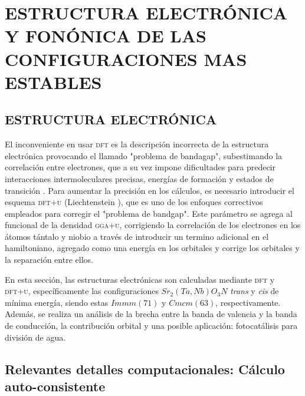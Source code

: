 
\chapter{ESTRUCTURA ELECTRÓNICA Y FONÓNICA DE LAS CONFIGURACIONES MAS ESTABLES}
\section{ESTRUCTURA ELECTRÓNICA}

El inconveniente en usar \textsc{dft} es la descripción incorrecta de la estructura electrónica provocando el llamado "problema de bandagap", subestimando la correlación entre electrones, que a su vez impone dificultades para predecir interacciones intermoleculares precisas, energías de formación y estados de transición \cite{Tolba2018}. Para aumentar la precisión en los cálculos, es necesario introducir el esquema \textsc{dft+u} (Liechtenstein \cite{Lichtenstein1995StrongOrdering}), que es uno de los enfoques correctivos empleados para corregir el "problema de bandgap". Este parámetro se agrega al funcional de la densidad \textsc{gga+u}, corrigiendo la correlación de los electrones en los átomos tántalo y niobio a través de introducir un termino adicional en el hamiltoniano, agregado como una energía en los orbitales y corrige los orbitales y la separación entre ellos.

En esta sección, las estructuras electrónicas son calculadas mediante \textsc{dft} y \textsc{dft+u}, específicamente las configuraciones $Sr_{2}(Ta,Nb)O_{3}N$ \emph{trans} y \emph{cis} de mínima energía, siendo estas $Immm(71)$ y $Cmcm(63)$, respectivamente. Además, se realiza un análisis de la brecha entre la banda de valencia y la banda de conducción, la contribución orbital y una posible aplicación: fotocatálisis para división de agua.  

\section{Relevantes detalles computacionales: Cálculo auto-consistente}

